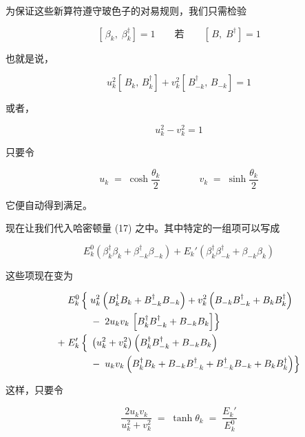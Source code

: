 为保证这些新算符遵守玻色子的对易规则，我们只需检验

\begin{equation*}
\left[\,\beta_k,\;\beta_k^{\dagger}\right] = 1 \qquad\text{若}\qquad \left[\,B,\;B^{\dagger}\right] = 1
\end{equation*}

也就是说，

\begin{equation*}
u_k^{2}\left[\,B_k,\,B_k^{\dagger}\right] + v_k^{2}\left[\,B_{-k}^{\dagger},\,B_{-k}\right] = 1
\end{equation*}

或者，

\begin{equation*}
u_k^{2} - v_k^{2} = 1
\end{equation*}

只要令

\begin{equation*}
u_k \;=\; \cosh\frac{\theta_k}{2} \qquad\qquad v_k \;=\; \sinh\frac{\theta_k}{2}
\end{equation*}

它便自动得到满足。

现在让我们代入哈密顿量 (17) 之中。其中特定的一组项可以写成

\begin{equation*}
E_k^{0}\left(\beta_k^{\dagger}\beta_k + \beta_{-k}^{\dagger}\beta_{-k}\right) + E_k'\left(\beta_k^{\dagger}\beta_{-k}^{\dagger} + \beta_{-k}\beta_k\right)
\end{equation*}

这些项现在变为

\begin{align*}
E_k^{0}\,\Bigl\{\; & u_k^{2}\left(B_k^{\dagger}B_k + B_{-k}^{\dagger}B_{-k}\right) + v_k^{2}\left(B_{-k}B_{-k}^{\dagger} + B_k B_k^{\dagger}\right) \\
& -\; 2u_k v_k\,\left[B_k^{\dagger}B_{-k}^{\dagger} + B_{-k}B_k\right]\Bigr\} \\
+\; E_k'\,\Bigl\{\; & \left(u_k^{2} + v_k^{2}\right)\left(B_k^{\dagger}B_{-k}^{\dagger} + B_{-k}B_k\right) \\
& -\; u_k v_k\left(B_k^{\dagger}B_k + B_{-k}B_{-k}^{\dagger} + B_{-k}^{\dagger}B_{-k} + B_k B_k^{\dagger}\right)\Bigr\}
\end{align*}

这样，只要令

\begin{equation*}
\frac{2u_k v_k}{u_k^{2} + v_k^{2}} \;=\; \tanh\theta_k \;=\; \frac{E_k'}{E_k^{0}} \tag{18}
\end{equation*}


